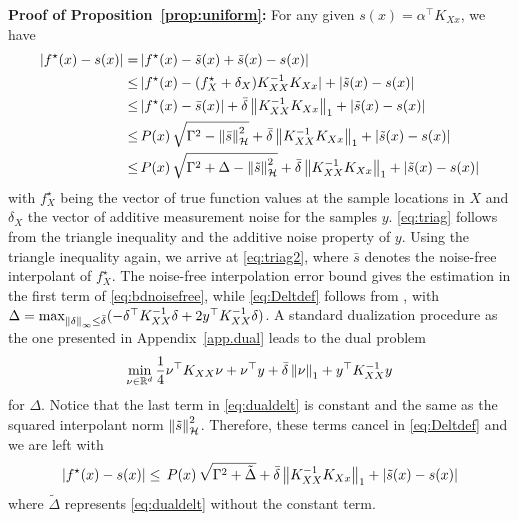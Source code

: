 \begin{my_proof}
	\textbf{Proof of Proposition~\ref{prop:uniform}:}
	For any given $s(x)=\alpha^\top K_{Xx}$, we have 
	\begin{align}\notag
		\vert f^\star(x) -s(x)\vert =& \, \vert f^\star(x) -\tilde{s}(x) + \tilde{s}(x)-s(x)\vert \\
		\le& \, \vert f^\star(x) - (f^\star_X + \delta_X) K_{XX}^{-1}K_{Xx}\vert + \vert  \tilde{s}(x)-s(x)\vert \label{eq:triag}\\
		\le& \, \vert f^\star(x) - \bar s(x)\vert + \bar \delta \left\| K_{XX}^{-1}K_{Xx} \right\|_1 + \vert  \tilde{s}(x)-s(x)\vert \label{eq:triag2}\\
		\le& \, P(x) \, \sqrt{ \Gamma^2  - \left\| \bar{s} \right\|_\mathcal{H}^2} + \bar \delta \left\| K_{XX}^{-1}K_{Xx} \right\|_1 + \vert  \tilde{s}(x)-s(x)\vert \label{eq:bdnoisefree}\\
		\le& \, P(x) \, \sqrt{ \Gamma^2 + \Delta - \left\| \tilde{s} \right\|_\mathcal{H}^2} + \bar \delta \left\| K_{XX}^{-1}K_{Xx} \right\|_1 + \vert  \tilde{s}(x)-s(x)\vert \label{eq:Deltdef}
	\end{align}
	with $f^\star_X$ being the vector of true function values at the sample locations in $X$ and $\delta_X$ the vector of additive measurement noise for the samples $y$. \eqref{eq:triag} follows from the triangle inequality and the additive noise property of $y$. Using the triangle inequality again, we arrive at \eqref{eq:triag2}, where $\bar s$ denotes the noise-free interpolant of $f^\star_X$. The noise-free interpolation error bound gives the estimation in the first term of \eqref{eq:bdnoisefree}, while \eqref{eq:Deltdef} follows from \cite[Lemma~1]{maddalena2020deterministic}, with $\Delta = \max_{\left\| \delta \right\|_\infty \leq \bar{\delta}} (- \delta^\top K_{XX}^{-1} \delta + 2 y ^\top K_{XX}^{-1} \delta)$. A standard dualization procedure as the one presented in Appendix~\ref{app.dual} leads to the dual problem
	\begin{equation}
		\label{eq:dualdelt}
		\min_{\nu \in \mathbb{R}^d} \frac{1}{4} \nu^\top K_{XX} \nu + \nu^\top y + \bar{\delta} \left\| \nu \right\|_1 + y^\top K_{XX}^{-1} y
	\end{equation}
	for $\Delta$. Notice that the last term in \eqref{eq:dualdelt} is constant and the same as the squared interpolant norm $\left\| \tilde{s} \right\|_\mathcal{H}^2$. Therefore, these terms cancel in \eqref{eq:Deltdef} and we are left with
	\begin{equation}
			\vert f^\star(x)-s(x)\vert  \le \, P(x) \, \sqrt{ \Gamma^2 + \tilde\Delta} + \bar \delta \left\| K_{XX}^{-1}K_{Xx} \right\|_1 + \vert  \tilde{s}(x)-s(x)\vert
	\end{equation}
	where $\tilde{\Delta}$ represents \eqref{eq:dualdelt} without the constant term.
\end{my_proof}

